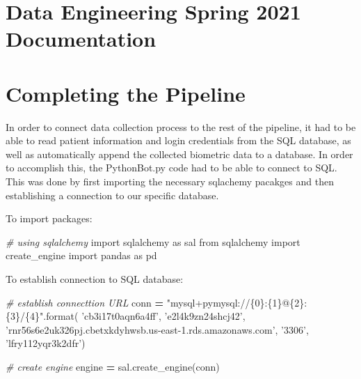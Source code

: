 \documentclass[]{book}
\newenvironment{Shaded}{\begin{snugshade}}{\end{snugshade}}
\newcommand{\SpecialCharTok}[1]{\textcolor[rgb]{0.00,0.00,0.00}{#1}}
\newcommand{\StringTok}[1]{\textcolor[rgb]{0.31,0.60,0.02}{#1}}
\newcommand{\ImportTok}[1]{#1}
\newcommand{\CommentTok}[1]{\textcolor[rgb]{0.56,0.35,0.01}{\textit{#1}}}
\newcommand{\OperatorTok}[1]{\textcolor[rgb]{0.81,0.36,0.00}{\textbf{#1}}}
\newcommand{\BuiltInTok}[1]{#1}
\newcommand{\NormalTok}[1]{#1}
\begin{document}
\section{Data Engineering Spring 2021
Documentation}\label{data-engineering-spring-2021-documentation}

\section{Completing the Pipeline}\label{completing-the-pipeline}

In order to connect data collection process to the rest of the pipeline,
it had to be able to read patient information and login credentials from
the SQL database, as well as automatically append the collected
biometric data to a database. In order to accomplish this, the
PythonBot.py code had to be able to connect to SQL. This was done by
first importing the necessary sqlachemy pacakges and then establishing a
connection to our specific database.

To import packages:

\begin{Shaded}
\begin{Highlighting}[]
\CommentTok{# using sqlalchemy}
\ImportTok{import}\NormalTok{ sqlalchemy }\ImportTok{as}\NormalTok{ sal}
\ImportTok{from}\NormalTok{ sqlalchemy }\ImportTok{import}\NormalTok{ create_engine}
\ImportTok{import}\NormalTok{ pandas }\ImportTok{as}\NormalTok{ pd}
\end{Highlighting}
\end{Shaded}

To establish connection to SQL database:

\begin{Shaded}
\begin{Highlighting}[]
\CommentTok{# establish connecttion URL}
\NormalTok{conn }\OperatorTok{=} \StringTok{"mysql+pymysql://}\SpecialCharTok{\{0\}}\StringTok{:}\SpecialCharTok{\{1\}}\StringTok{@}\SpecialCharTok{\{2\}}\StringTok{:}\SpecialCharTok{\{3\}}\StringTok{/}\SpecialCharTok{\{4\}}\StringTok{"}\NormalTok{.}\BuiltInTok{format}\NormalTok{(}
    \StringTok{'cb3i17t0aqn6a4ff'}\NormalTok{, }\StringTok{'e2l4k9zn24shcj42'}\NormalTok{, }\StringTok{'rnr56s6e2uk326pj.cbetxkdyhwsb.us-east-1.rds.amazonaws.com'}\NormalTok{, }\StringTok{'3306'}\NormalTok{, }\StringTok{'lfry112yqr3k2dfr'}\NormalTok{)}
 
\CommentTok{# create engine}
\NormalTok{engine }\OperatorTok{=}\NormalTok{ sal.create_engine(conn)}
\end{Highlighting}
\end{Shaded}
\end{document}
